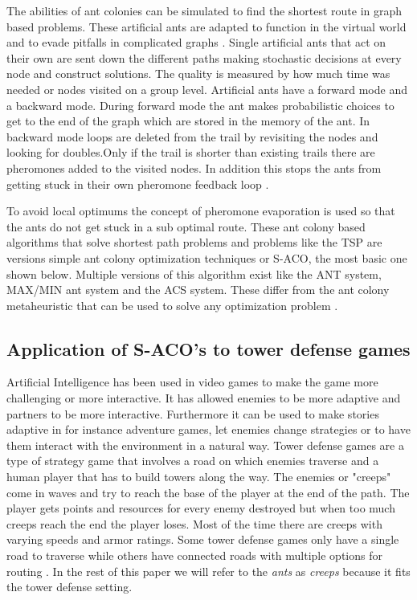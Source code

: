 The abilities of ant colonies can be simulated to find the shortest route in graph based problems. These artificial ants are adapted to function in the virtual world and to evade pitfalls in complicated graphs \cite{gambardella1999macs}.
Single artificial ants that act on their own are sent down the different paths making stochastic decisions at every node and construct solutions. The quality is measured by how much time was needed or nodes visited on a group level.\cite{dorigo2010ant} Artificial ants have a forward mode and a backward mode. During forward mode the ant makes probabilistic choices to get to the end of the graph which are stored in the memory of the ant. In backward mode loops are deleted from the trail by revisiting the nodes and looking for doubles.Only if the trail is shorter than existing trails there are pheromones added to the visited nodes. In addition this stops the ants from getting stuck in their own pheromone feedback loop \cite{dorigo2001experimental}.

To avoid local optimums the concept of pheromone evaporation is used so that the ants do not get stuck in a sub optimal route. \cite{korb2007ant} These ant colony based algorithms that solve shortest path problems and problems like the TSP are versions simple ant colony optimization techniques or S-ACO, the most basic one shown below\cite{dorigo1997ant}.  Multiple versions of this algorithm exist like the ANT system, MAX/MIN ant system and the ACS system. These differ from the ant colony metaheuristic that can be used to solve any optimization problem \cite{stutzle1999max}.

\subsection {Application of S-ACO’s to tower defense games}

Artificial Intelligence has been used in video games to make the game more challenging or more interactive. It has allowed enemies to be more adaptive and partners to be more interactive. Furthermore it can be used to make stories adaptive in for instance adventure games, let enemies change strategies or to have them interact with the environment in a natural way\cite{laird2001human}.  Tower defense games are a type of strategy game that involves a road on which enemies traverse and a human player that has to build towers along the way. The enemies or "creeps" come in waves and try to reach the base of the player at the end of the path. The player gets points and resources for every enemy destroyed but when too much creeps reach the end the player loses. Most of the time there are creeps with varying speeds and armor ratings. Some tower defense games only have a single road to traverse while others have connected roads with multiple options for routing \cite{tan2013automated}. In the rest of this paper we will refer to the \textit{ants} as \textit{creeps} because it fits the tower defense setting.

